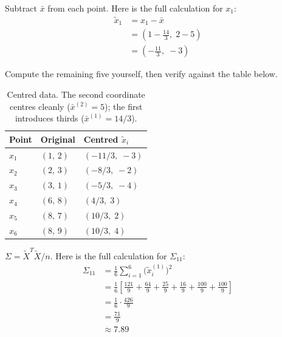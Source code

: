 Subtract $\bar{x}$ from each point. Here is the full calculation for $x_1$:
\begin{align*}
    \tilde{x}_1 &= x_1 - \bar{x} \\
                 &= \left(1 - \tfrac{14}{3},\; 2 - 5\right) \\
                 &= \left(-\tfrac{11}{3},\; -3\right)
\end{align*}

\vspace{3.5em}
Compute the remaining five yourself, then verify against the table below.

\begin{table}[ht]
\centering
\begin{tabular}{p{}p{}p{}}
    \toprule
    \textbf{Point} & \textbf{Original} & \textbf{Centred $\tilde{x}_i$} \\
    \midrule
    $x_1$ & $(1,\, 2)$   & $(-11/3,\; -3)$ \\
    $x_2$ & $(2,\, 3)$   & $(-8/3,\; -2)$ \\
    $x_3$ & $(3,\, 1)$   & $(-5/3,\; -4)$ \\
    $x_4$ & $(6,\, 8)$   & $(4/3,\; 3)$ \\
    $x_5$ & $(8,\, 7)$   & $(10/3,\; 2)$ \\
    $x_6$ & $(8,\, 9)$   & $(10/3,\; 4)$ \\
    \bottomrule
\end{tabular}
\vspace{2em}
\caption{Centred data. The second coordinate centres cleanly ($\bar{x}^{(2)}{=}5$); the first introduces thirds ($\bar{x}^{(1)}{=}14/3$).}
\label{tab:pca_centred}
\end{table}


\newpage
{} $\Sigma = \tilde{X}^T \tilde{X} / n$. Here is the full calculation for $\Sigma_{11}$:
\begin{align*}
    \Sigma_{11} &= \frac{1}{6}\sum_{i=1}^{6} \bigl(\tilde{x}_i^{(1)}\bigr)^2 \\
                &= \frac{1}{6}\left[\frac{121}{9} + \frac{64}{9} + \frac{25}{9} + \frac{16}{9} + \frac{100}{9} + \frac{100}{9}\right] \\
                &= \frac{1}{6} \cdot \frac{426}{9} \\
                &= \frac{71}{9} \\
                &\approx 7.89
\end{align*}

